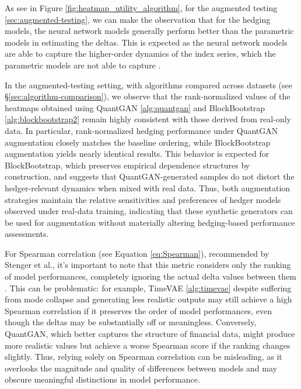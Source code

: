 \documentclass[sigconf]{acmart}
\begin{document}
    As see in Figure \ref{fig:heatmap_utility_algorithm},
    for the augmented testing \ref{sec:augmented-testing}, we can make the observation that for the
    hedging models, the neural network models generally perform better
    than the parametric models in estimating the deltas. This is expected
    as the neural network models are able to capture the higher-order
    dynamics of the index series, which the parametric models are not
    able to capture \cite{Fecamp20}.

    In the augmented-testing setting, with algorithms compared across
    datasets (see §\ref{sec:algorithm-comparison}), we observe that
    the rank-normalized values of the
    heatmaps obtained using QuantGAN \ref{alg:quantgan}
    and BlockBootstrap \ref{alg:blockbootstrap2}
     remain highly consistent with those derived from real-only
    data. In particular, rank-normalized hedging performance under
    QuantGAN augmentation closely matches the baseline ordering, while
    BlockBootstrap augmentation yields nearly identical results. This
    behavior is expected for BlockBootstrap, which preserves empirical
    dependence structures by construction, and suggests that
    QuantGAN-generated samples do not distort the hedger-relevant
    dynamics when mixed with real data. Thus, both augmentation
    strategies maintain the relative sensitivities and preferences of
    hedger models observed under real-data training, indicating that
    these synthetic generators can be used for augmentation without
    materially altering hedging-based performance assessments.

    For Spearman correlation (see Equation \ref{eq:Spearman}),
    recommended by Stenger et al., it's important to note that this metric
    considers only the ranking of model performances, completely ignoring
    the actual delta values between them \cite{Stenger24}. This can be 
    problematic: for
    example, TimeVAE \ref{alg:timevae} \textemdash despite suffering 
    from mode collapse and generating
    less realistic outputs \textemdash may still achieve a high Spearman correlation
    if it preserves the order of model performances, even though the
    deltas may be substantially off or meaningless. Conversely, QuantGAN,
    which better captures the structure of financial data, might produce
    more realistic values but achieve a worse Spearman score if the
    ranking changes slightly. Thus, relying solely on Spearman
    correlation can be misleading, as it overlooks the magnitude and
    quality of differences between models and may obscure meaningful
    distinctions in model performance.
  
\end{document}
